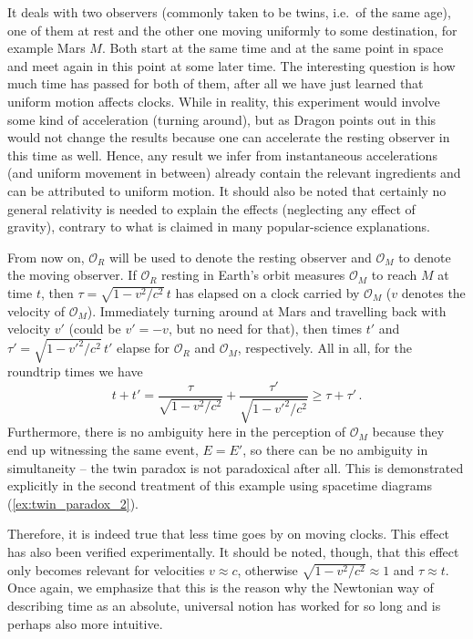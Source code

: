 \begin{ex}\label{ex:twin_paradox_1}
	It deals with two observers (commonly taken to be twins, i.e.~of the same age), one of them at rest and the other one moving uniformly to some destination, for example Mars $M$. Both start at the same time and at the same point in space and meet again in this point at some later time. The interesting question is how much time has passed for both of them, after all we have just learned that uniform motion affects clocks. While in reality, this experiment would involve some kind of acceleration (turning around), but as Dragon points out in \cite{dragon_geometry_srt} this would not change the results because one can accelerate the resting observer in this time as well. Hence, any result we infer from instantaneous accelerations (and uniform movement in between) already contain the relevant ingredients and can be attributed to uniform motion. It should also be noted that certainly no general relativity is needed to explain the effects (neglecting any effect of gravity), contrary to what is claimed in many popular-science explanations.
	
	From now on, $\mathcal{O}_R$ will be used to denote the resting observer and $\mathcal{O}_M$ to denote the moving observer. If $\mathcal{O}_R$ resting in Earth's orbit measures $\mathcal{O}_M$ to reach $M$ at time $t$, then $\tau = \sqrt{1 - v^2 / c^2} \, t$ has elapsed on a clock carried by $\mathcal{O}_M$ ($v$ denotes the velocity of $\mathcal{O}_M$). Immediately turning around at Mars and travelling back with velocity $v'$ (could be $v' = -v$, but no need for that), then times $t'$ and $\tau' = \sqrt{1 - v'^2 / c^2} \, t'$ elapse for $\mathcal{O}_R$ and $\mathcal{O}_M$, respectively. All in all, for the roundtrip times we have
	\begin{equation*}
		t + t' = \frac{\tau}{\sqrt{1 - v^2 / c^2}} + \frac{\tau'}{\sqrt{1 - v'^2 / c^2}} \geq \tau + \tau' \, .
	\end{equation*}
	Furthermore, there is no ambiguity here in the perception of $\mathcal{O}_M$ because they end up witnessing the same event, $E = E'$, so there can be no ambiguity in simultaneity -- the twin paradox is not paradoxical after all. This is demonstrated explicitly in the second treatment of this example using spacetime diagrams (\ref{ex:twin_paradox_2}).
\end{ex}
Therefore, it is indeed true that less time goes by on moving clocks. This effect has also been verified experimentally. It should be noted, though, that this effect only becomes relevant for velocities $v \approx c$, otherwise $\sqrt{1 - v^2 / c^2} \approx 1$ and $\tau \approx t$. Once again, we emphasize that this is the reason why the Newtonian way of describing time as an absolute, universal notion has worked for so long and is perhaps also more intuitive.



